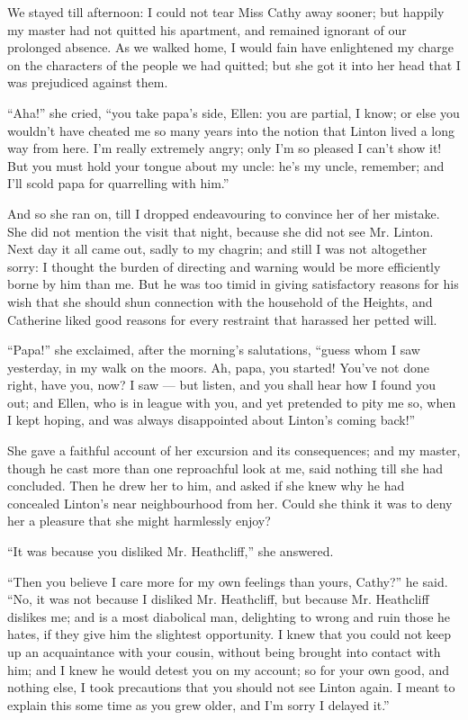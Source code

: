\par We stayed till afternoon: I could not tear Miss Cathy away sooner; but happily my master had not quitted his apartment, and remained ignorant of our prolonged absence. As we walked home, I would fain have enlightened my charge on the characters of the people we had quitted; but she got it into her head that I was prejudiced against them.
\par “Aha!” she cried, “you take papa's side, Ellen: you are partial, I know; or else you wouldn't have cheated me so many years into the notion that Linton lived a long way from here. I'm really extremely angry; only I'm so pleased I can't show it! But you must hold your tongue about my uncle: he's my uncle, remember; and I'll scold papa for quarrelling with him.”
\par And so she ran on, till I dropped endeavouring to convince her of her mistake. She did not mention the visit that night, because she did not see Mr. Linton. Next day it all came out, sadly to my chagrin; and still I was not altogether sorry: I thought the burden of directing and warning would be more efficiently borne by him than me. But he was too timid in giving satisfactory reasons for his wish that she should shun connection with the household of the Heights, and Catherine liked good reasons for every restraint that harassed her petted will.
\par “Papa!” she exclaimed, after the morning's salutations, “guess whom I saw yesterday, in my walk on the moors. Ah, papa, you started! You've not done right, have you, now? I saw — but listen, and you shall hear how I found you out; and Ellen, who is in league with you, and yet pretended to pity me so, when I kept hoping, and was always disappointed about Linton's coming back!”
\par She gave a faithful account of her excursion and its consequences; and my master, though he cast more than one reproachful look at me, said nothing till she had concluded. Then he drew her to him, and asked if she knew why he had concealed Linton's near neighbourhood from her. Could she think it was to deny her a pleasure that she might harmlessly enjoy?
\par “It was because you disliked Mr. Heathcliff,” she answered.
\par “Then you believe I care more for my own feelings than yours, Cathy?” he said. “No, it was not because I disliked Mr. Heathcliff, but because Mr. Heathcliff dislikes me; and is a most diabolical man, delighting to wrong and ruin those he hates, if they give him the slightest opportunity. I knew that you could not keep up an acquaintance with your cousin, without being brought into contact with him; and I knew he would detest you on my account; so for your own good, and nothing else, I took precautions that you should not see Linton again. I meant to explain this some time as you grew older, and I'm sorry I delayed it.”
